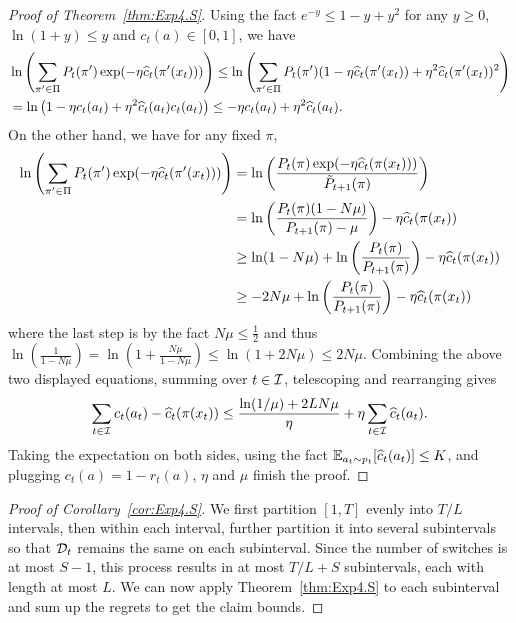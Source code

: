 \begin{proof}[Proof of Theorem~\ref{thm:Exp4.S}]
Using the fact $e^{-y} \leq 1-y+y^2$ for any $y \geq 0$, $\ln(1+y) \leq y$ and $c_t(a) \in [0,1]$, we have
\begin{align*}
&\ln \left( \sum_{\pi' \in \Pi} P_t(\pi') \exp( -\eta \widehat{c}_t(\pi'(x_t)) ) \right) 
\leq \ln \left( \sum_{\pi' \in \Pi} P_t(\pi') (1 -\eta \widehat{c}_t(\pi'(x_t)) + \eta^2 \widehat{c}_t(\pi'(x_t))^2 \right)\\
&= \ln \left(1 - \eta {c}_t(a_t) + \eta^2 \widehat{c}_t(a_t) c_t(a_t) \right) 
\leq  - \eta {c}_t(a_t)  + \eta^2 \widehat{c}_t(a_t). 
\end{align*}
On the other hand, we have for any fixed $\pi$, 
\begin{align*}
\ln \left( \sum_{\pi' \in \Pi} P_t(\pi') \exp( -\eta \widehat{c}_t(\pi'(x_t)) ) \right) 
&= \ln\left( \frac{P_t(\pi) \exp( -\eta \widehat{c}_t(\pi(x_t)) )}{\tilde{P}_{t+1}(\pi)}  \right) \\
&= \ln\left( \frac{P_t(\pi)(1-N\mu)  }{P_{t+1}(\pi)-\mu} \right)  -\eta \widehat{c}_t(\pi(x_t))  \\
&\geq \ln(1-N\mu) + \ln\left( \frac{{P}_t(\pi) }{{P}_{t+1}(\pi)} \right)  -\eta \widehat{c}_t(\pi(x_t))  \\
&\geq -2N\mu + \ln\left( \frac{{P}_t(\pi) }{P_{t+1}(\pi)} \right)  -\eta \widehat{c}_t(\pi(x_t))  
\end{align*}
where the last step is by the fact $N\mu \leq \frac{1}{2}$ and thus
$\ln(\frac{1}{1-N\mu}) = \ln(1 + \frac{N\mu}{1-N\mu}) \leq \ln(1 + 2N\mu) \leq 2N\mu$.
Combining the above two displayed equations, summing over $t\in{\mathcal{I}}$, telescoping and rearranging gives
\[
\sum_{t\in{\mathcal{I}}} c_t(a_t) - \widehat{c}_t(\pi(x_t))  \leq 
\frac{\ln(1/\mu) + 2LN\mu}{\eta} + \eta \sum_{t\in{\mathcal{I}}}\widehat{c}_t(a_t).
\]
Taking the expectation on both sides, using the fact $\mathbb{E}_{a_t\sim p_t}[\widehat{c}_t(a_t)] \leq K$,
and plugging $c_t(a) = 1 - r_t(a)$, $\eta$ and $\mu$ finish the proof.
\end{proof}

\begin{proof}[Proof of Corollary~\ref{cor:Exp4.S}]
We first partition $[1, T]$ evenly into $T/L$ intervals,
then within each interval, further partition it into several subintervals
so that ${\mathcal{D}}_t$ remains the same on each subinterval.
Since the number of switches is at most $S-1$, 
this process results in at most $T/L + S$ subintervals, each with length at most $L$.
We can now apply Theorem~\ref{thm:Exp4.S} to each subinterval and
sum up the regrets to get the claim bounds.
\end{proof}

